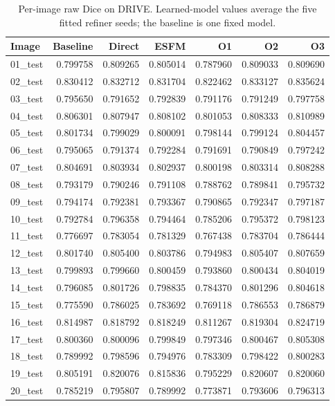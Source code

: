 \begin{table}[p]
\caption{Per-image raw Dice on DRIVE. Learned-model values average the five fitted refiner seeds; the baseline is one fixed model.}\label{tab:completion-drive-image-means}
\centering\small\setlength{\tabcolsep}{4pt}
\begin{tabular}{lrrrrrr}
\toprule
Image & Baseline & Direct & ESFM & O1 & O2 & O3 \\
\midrule
01\_test & 0.799758 & 0.809265 & 0.805014 & 0.787960 & 0.809033 & 0.809690 \\
02\_test & 0.830412 & 0.832712 & 0.831704 & 0.822462 & 0.833127 & 0.835624 \\
03\_test & 0.795650 & 0.791652 & 0.792839 & 0.791176 & 0.791249 & 0.797758 \\
04\_test & 0.806301 & 0.807947 & 0.808102 & 0.801053 & 0.808333 & 0.810989 \\
05\_test & 0.801734 & 0.799029 & 0.800091 & 0.798144 & 0.799124 & 0.804457 \\
06\_test & 0.795065 & 0.791374 & 0.792284 & 0.791691 & 0.790849 & 0.797242 \\
07\_test & 0.804691 & 0.803934 & 0.802937 & 0.800198 & 0.803314 & 0.808288 \\
08\_test & 0.793179 & 0.790246 & 0.791108 & 0.788762 & 0.789841 & 0.795732 \\
09\_test & 0.794174 & 0.792381 & 0.793367 & 0.790865 & 0.792347 & 0.797187 \\
10\_test & 0.792784 & 0.796358 & 0.794464 & 0.785206 & 0.795372 & 0.798123 \\
11\_test & 0.776697 & 0.783054 & 0.781329 & 0.767438 & 0.783704 & 0.786444 \\
12\_test & 0.801740 & 0.805400 & 0.803786 & 0.794983 & 0.805407 & 0.807659 \\
13\_test & 0.799893 & 0.799660 & 0.800459 & 0.793860 & 0.800434 & 0.804019 \\
14\_test & 0.796085 & 0.801726 & 0.798835 & 0.784370 & 0.801296 & 0.804618 \\
15\_test & 0.775590 & 0.786025 & 0.783692 & 0.769118 & 0.786553 & 0.786879 \\
16\_test & 0.814987 & 0.818792 & 0.818249 & 0.811267 & 0.819304 & 0.824719 \\
17\_test & 0.800360 & 0.800096 & 0.799849 & 0.797346 & 0.800467 & 0.805308 \\
18\_test & 0.789992 & 0.798596 & 0.794976 & 0.783309 & 0.798422 & 0.800283 \\
19\_test & 0.805191 & 0.820076 & 0.815836 & 0.795229 & 0.820607 & 0.820060 \\
20\_test & 0.785219 & 0.795807 & 0.789992 & 0.773871 & 0.793606 & 0.796313 \\
\bottomrule
\end{tabular}
\end{table}

